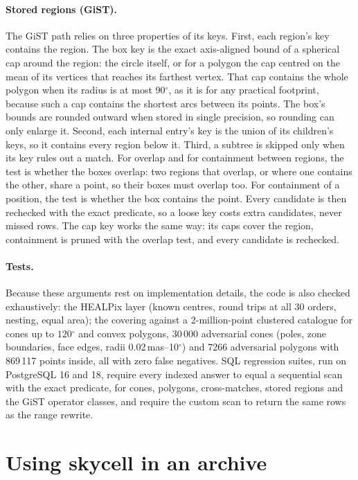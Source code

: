 \documentclass[preprint,12pt]{elsarticle}
\newcommand{\degr}{\ensuremath{^{\circ}}}
\begin{document}
\paragraph{Stored regions (GiST).} The GiST path relies on three properties of its
keys. First, each region's key contains the region. The box key is the exact
axis-aligned bound of a spherical cap around the region: the circle itself, or for a
polygon the cap centred on the mean of its vertices that reaches its farthest vertex.
That cap contains the whole polygon when its radius is at most $90\degr$, as it is for
any practical footprint, because such a cap contains the shortest arcs between its
points. The box's bounds are rounded outward when stored in single precision, so
rounding can only enlarge it. Second, each internal entry's key is the union of its
children's keys, so it contains every region below it. Third, a subtree is skipped only
when its key rules out a match. For overlap and for containment between regions, the
test is whether the boxes overlap: two regions that overlap, or where one contains the
other, share a point, so their boxes must overlap too. For containment of a position,
the test is whether the box contains the point. Every candidate is then rechecked with
the exact predicate, so a loose key costs extra candidates, never missed rows. The cap
key works the same way: its caps cover the region, containment is pruned with the
overlap test, and every candidate is rechecked.

\paragraph{Tests.} Because these arguments rest on implementation details, the code is
also checked exhaustively: the HEALPix layer (known centres, round trips at all 30
orders, nesting, equal area); the covering against a 2-million-point clustered catalogue
for cones up to $120\degr$ and convex polygons, 30\,000 adversarial cones (poles, zone
boundaries, face edges, radii 0.02\,mas--10\degr) and 7266 adversarial polygons with
869\,117 points inside, all with zero false negatives. SQL regression suites, run on
PostgreSQL 16 and 18, require every indexed answer to equal a sequential scan with the
exact predicate, for cones, polygons, cross-matches, stored regions and the GiST
operator classes, and require the custom scan to return the same rows as the range
rewrite.

\section{Using skycell in an archive}
\label{sec:adql}
\end{document}
